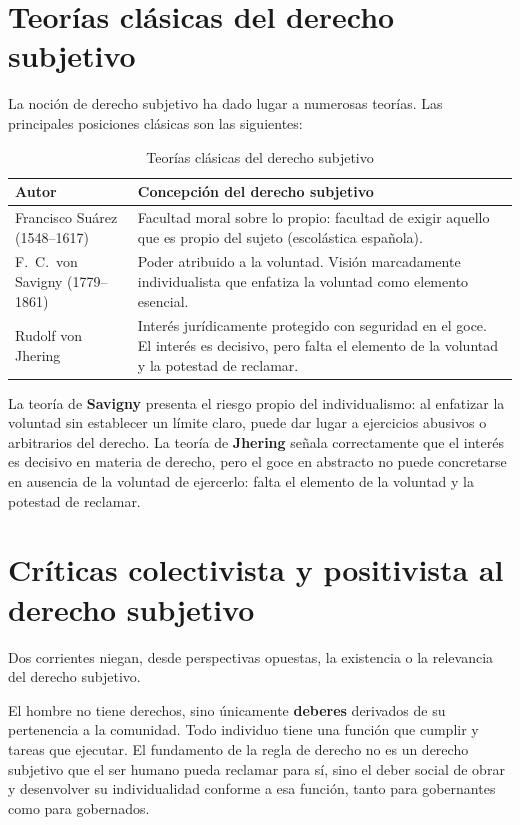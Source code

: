 \documentclass[12pt,oneside]{book}
\begin{document}
\section{Teorías clásicas del derecho subjetivo}

La noción de derecho subjetivo ha dado lugar a numerosas teorías. Las principales posiciones clásicas son las siguientes:

\begin{table}[H]
\centering
\begin{tabularx}{\textwidth}{B{0.27\textwidth} Y}
\toprule
\textbf{Autor} & \textbf{Concepción del derecho subjetivo} \\
\midrule
Francisco Suárez (1548--1617) & Facultad moral sobre lo propio: facultad de exigir aquello que es propio del sujeto (escolástica española). \\
F.~C.~von Savigny (1779--1861) & Poder atribuido a la voluntad. Visión marcadamente individualista que enfatiza la voluntad como elemento esencial. \\
Rudolf von Jhering & Interés jurídicamente protegido con seguridad en el goce. El interés es decisivo, pero falta el elemento de la voluntad y la potestad de reclamar. \\
\bottomrule
\end{tabularx}
\caption{Teorías clásicas del derecho subjetivo}
\end{table}

\begin{importante}
La teoría de \textbf{Savigny} presenta el riesgo propio del individualismo: al enfatizar la voluntad sin establecer un límite claro, puede dar lugar a ejercicios abusivos o arbitrarios del derecho. La teoría de \textbf{Jhering} señala correctamente que el interés es decisivo en materia de derecho, pero el goce en abstracto no puede concretarse en ausencia de la voluntad de ejercerlo: falta el elemento de la voluntad y la potestad de reclamar.
\end{importante}

\section{Críticas colectivista y positivista al derecho subjetivo}

Dos corrientes niegan, desde perspectivas opuestas, la existencia o la relevancia del derecho subjetivo.

\begin{definicion}
El hombre no tiene derechos, sino únicamente \textbf{deberes} derivados de su pertenencia a la comunidad. Todo individuo tiene una función que cumplir y tareas que ejecutar. El fundamento de la regla de derecho no es un derecho subjetivo que el ser humano pueda reclamar para sí, sino el deber social de obrar y desenvolver su individualidad conforme a esa función, tanto para gobernantes como para gobernados.
\end{definicion}
\end{document}
